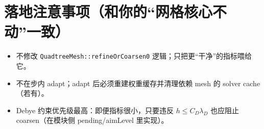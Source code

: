\documentclass[UTF8,11pt,a4paper]{ctexart}
\begin{document}
\section{落地注意事项（和你的“网格核心不动”一致）}
\begin{itemize}[leftmargin=1.6em]
  \item 不修改 \texttt{QuadtreeMesh::refineOrCoarsen0} 逻辑；只把更“干净”的指标喂给它。
  \item 不在步内 adapt；adapt 后必须重建权重缓存并清理依赖 mesh 的 solver cache（若有）。
  \item Debye 约束优先级最高：即便指标很小，只要违反 $h \le C_D\lambda_D$ 也应阻止 coarsen（在模块侧 pending/aimLevel 里实现）。
\end{itemize}
\end{document}

